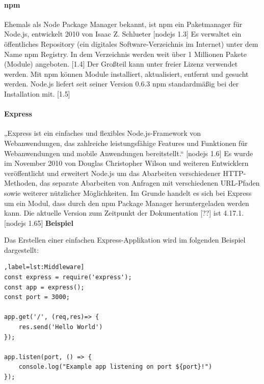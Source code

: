 \paragraph{npm}
Ehemals als Node Package Manager bekannt, ist npm ein Paketmanager für Node.js, entwickelt 2010 von Isaac Z. Schlueter [nodejs 1.3] Es verwaltet ein öffentliches Repository (ein digitales Software-Verzeichnis im Internet) unter dem Name npm Registry. In dem Verzeichnis werden weit über 1 Millionen Pakete (Module) angeboten. [1.4] Der Großteil kann unter freier Lizenz verwendet werden. Mit npm können Module installiert, aktualisiert, entfernt und gesucht werden. Node.js liefert seit seiner Version 0.6.3 npm standardmäßig bei der Installation mit. [1.5]

\paragraph{Express}
„Express ist ein einfaches und flexibles Node.js-Framework von Webanwendungen, das zahlreiche leistungsfähige Features und Funktionen für Webanwendungen und mobile Anwendungen bereitstellt.“ [nodejs 1.6] Es wurde im November 2010 von Douglas Christopher Wilson und weiteren Entwicklern veröffentlicht und erweitert Node.js um das Abarbeiten verschiedener HTTP-Methoden, das separate Abarbeiten von Anfragen mit verschiedenen URL-Pfaden sowie weiterer nützlicher Möglichkeiten. Im Grunde handelt es sich bei Express um ein Modul, dass durch den npm Package Manager heruntergeladen werden kann. Die aktuelle Version zum Zeitpunkt der Dokumentation [??] ist 4.17.1. [nodejs 1.65] \newline
\newline
\textbf{Beispiel}
 \newline

\noindent
Das Erstellen einer einfachen Express-Applikation wird im folgenden Beispiel dargestellt:\newline

\begin{lstlisting}[caption=Einfacher Webserver [nodejs 1.8],label=lst:Middleware]
const express = require('express');
const app = express();
const port = 3000;

app.get('/', (req,res)=> {
	res.send('Hello World')
});

app.listen(port, () => {
	console.log("Example app listening on port ${port}!")
});
\end{lstlisting}




